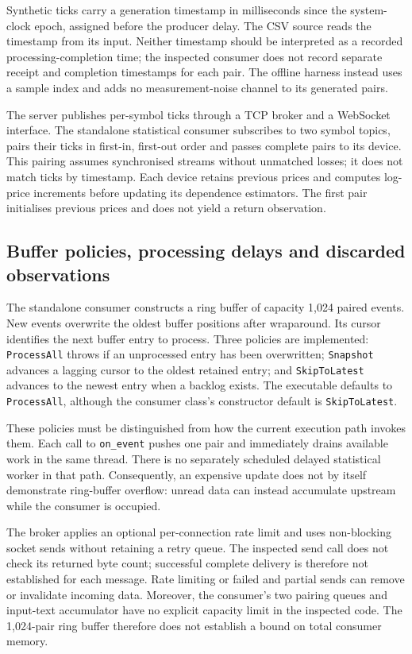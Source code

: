 Synthetic ticks carry a generation timestamp in milliseconds since the system-clock epoch, assigned before the producer delay. The CSV source reads the timestamp from its input. Neither timestamp should be interpreted as a recorded processing-completion time; the inspected consumer does not record separate receipt and completion timestamps for each pair. The offline harness instead uses a sample index and adds no measurement-noise channel to its generated pairs.

The server publishes per-symbol ticks through a TCP broker and a WebSocket interface. The standalone statistical consumer subscribes to two symbol topics, pairs their ticks in first-in, first-out order and passes complete pairs to its device. This pairing assumes synchronised streams without unmatched losses; it does not match ticks by timestamp. Each device retains previous prices and computes log-price increments before updating its dependence estimators. The first pair initialises previous prices and does not yield a return observation.

\subsection{Buffer policies, processing delays and discarded observations}
The standalone consumer constructs a ring buffer of capacity 1,024 paired events. New events overwrite the oldest buffer positions after wraparound. Its cursor identifies the next buffer entry to process. Three policies are implemented: \texttt{ProcessAll} throws if an unprocessed entry has been overwritten; \texttt{Snapshot} advances a lagging cursor to the oldest retained entry; and \texttt{SkipToLatest} advances to the newest entry when a backlog exists. The executable defaults to \texttt{ProcessAll}, although the consumer class's constructor default is \texttt{SkipToLatest}.

These policies must be distinguished from how the current execution path invokes them. Each call to \texttt{on\_event} pushes one pair and immediately drains available work in the same thread. There is no separately scheduled delayed statistical worker in that path. Consequently, an expensive update does not by itself demonstrate ring-buffer overflow: unread data can instead accumulate upstream while the consumer is occupied.

The broker applies an optional per-connection rate limit and uses non-blocking socket sends without retaining a retry queue. The inspected send call does not check its returned byte count; successful complete delivery is therefore not established for each message. Rate limiting or failed and partial sends can remove or invalidate incoming data. Moreover, the consumer's two pairing queues and input-text accumulator have no explicit capacity limit in the inspected code. The 1,024-pair ring buffer therefore does not establish a bound on total consumer memory.

